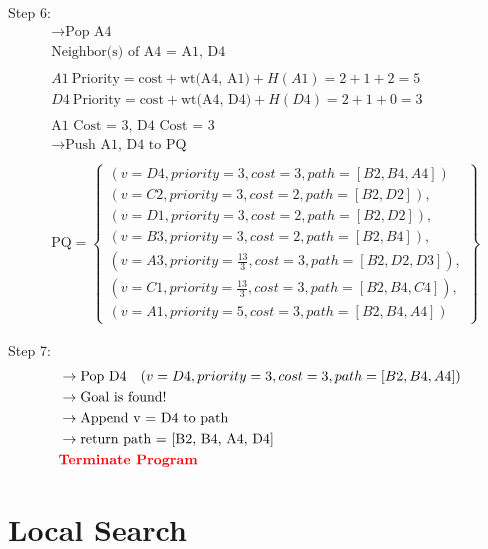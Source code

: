 \documentclass[a4paper]{article}
\begin{document}
\begin{sloppypar}
\begin{enumerate}[start=6,label=Q\arabic*,left=0pt]
    \par Step 6:
    \begin{align*}
        &\rightarrow \text{Pop A4} \\
        &\text{Neighbor(s) of A4 = A1, D4} \\\\
        &A1 \: \text{Priority} = \text{cost} + \text{wt(A4, A1)} + H(A1) = 2 + 1 + 2 = 5 \\
        &D4 \: \text{Priority} = \text{cost} + \text{wt(A4, D4)} + H(D4) = 2 + 1 + 0 = 3 \\\\
        &\text{A1 Cost = 3, D4 Cost = 3} \\
        &\rightarrow \text{Push A1, D4 to PQ} \\\\
        &\text{PQ} = \left\{\begin{array}{l}
            (v=D4, priority=3, cost=3, path=[B2, B4, A4]) \\
            (v=C2, priority=3, cost=2, path=[B2, D2]), \\
            (v=D1, priority=3, cost=2, path=[B2, D2]), \\
            (v=B3, priority=3, cost=2, path=[B2, B4]), \\
            (v=A3, priority=\frac{13}{3}, cost=3, path=[B2, D2, D3]), \\
            (v=C1, priority=\frac{13}{3}, cost=3, path=[B2, B4, C4]), \\
            (v=A1, priority=5, cost=3, path=[B2, B4, A4])
        \end{array}\right\}
    \end{align*}

    \par Step 7:
    \begin{align*}
        &\rightarrow \text{Pop D4} \quad (v=D4, priority=3, cost=3, path=[B2, B4, A4]) \\
        &\rightarrow \text{Goal is found!} \\
        &\rightarrow \text{Append v = D4 to path} \\
        &\rightarrow \text{return path = [B2, B4, A4, D4]} \\
        &\textcolor{red}{\textbf{Terminate Program}}
    \end{align*}

\end{enumerate}

\section{Local Search}


\end{sloppypar}
\end{document}
